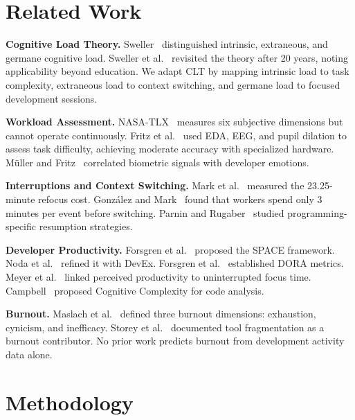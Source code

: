 \documentclass[conference]{IEEEtran}
\begin{document}
\section{Related Work}

\textbf{Cognitive Load Theory.} Sweller~\cite{sweller1988cognitive} distinguished intrinsic, extraneous, and germane cognitive load. Sweller et al.~\cite{sweller2019cognitive} revisited the theory after 20 years, noting applicability beyond education. We adapt CLT by mapping intrinsic load to task complexity, extraneous load to context switching, and germane load to focused development sessions.

\textbf{Workload Assessment.} NASA-TLX~\cite{hart1988development} measures six subjective dimensions but cannot operate continuously. Fritz et al.~\cite{fritz2014developers} used EDA, EEG, and pupil dilation to assess task difficulty, achieving moderate accuracy with specialized hardware. M\"{u}ller and Fritz~\cite{muller2015stuck} correlated biometric signals with developer emotions.

\textbf{Interruptions and Context Switching.} Mark et al.~\cite{mark2008cost} measured the 23.25-minute refocus cost. Gonz\'{a}lez and Mark~\cite{gonzalez2004constant} found that workers spend only 3 minutes per event before switching. Parnin and Rugaber~\cite{parnin2011resumption} studied programming-specific resumption strategies.

\textbf{Developer Productivity.} Forsgren et al.~\cite{forsgren2021space} proposed the SPACE framework. Noda et al.~\cite{noda2023devex} refined it with DevEx. Forsgren et al.~\cite{forsgren2018accelerate} established DORA metrics. Meyer et al.~\cite{meyer2019today} linked perceived productivity to uninterrupted focus time. Campbell~\cite{campbell2018cognitive} proposed Cognitive Complexity for code analysis.

\textbf{Burnout.} Maslach et al.~\cite{maslach1996maslach} defined three burnout dimensions: exhaustion, cynicism, and inefficacy. Storey et al.~\cite{storey2020software} documented tool fragmentation as a burnout contributor. No prior work predicts burnout from development activity data alone.

\section{Methodology}
\end{document}
